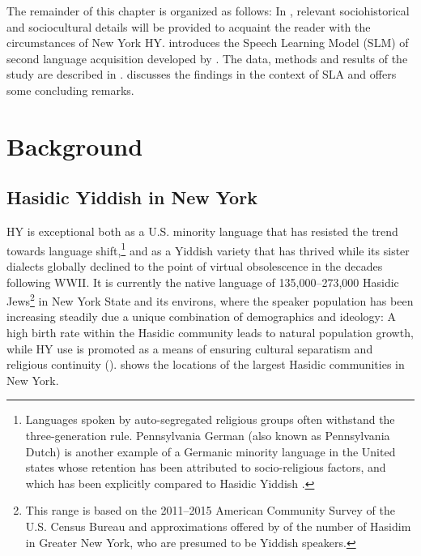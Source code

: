 \documentclass[output=paper]{langsci/langscibook}
\begin{document}
The remainder of this chapter is organized as follows: In , relevant sociohistorical and sociocultural details will be provided to acquaint the reader with the circumstances of New York HY.  introduces the Speech Learning Model (SLM) of second language acquisition developed by \citet{Flege1995, Flege1996}. The data, methods and results of the study are described in .  discusses the findings in the context of SLA and offers some concluding remarks.  

\section{Background}
\label{sec:nove:2}


\subsection{Hasidic Yiddish in New York}
\label{sec:nove:2.1}

HY is exceptional both as a U.S. minority language that has resisted the trend towards language shift,\footnote{Languages spoken by auto-segregated religious groups often withstand the three-generation rule. Pennsylvania German (also known as Pennsylvania Dutch) is another example of a Germanic minority language in the United states whose retention has been attributed to socio-religious factors, and which has been explicitly compared to Hasidic Yiddish \citep{Louden2016}.} and as a Yiddish variety that has thrived while its sister dialects globally declined to the point of virtual obsolescence in the decades following WWII. It is currently the native language of 135,000--273,000 Hasidic Jews\footnote{This range is based on the 2011--2015 American Community Survey of the U.S. Census Bureau \citep{MansonEtAl2017} and approximations offered by \citet{BialeEtAl2018} of the number of Hasidim in Greater New York, who are presumed to be Yiddish speakers.} in New York State and its environs, where the speaker population has been increasing steadily due a unique combination of demographics and ideology: A high birth rate within the Hasidic community leads to natural population growth, while HY use is promoted as a means of ensuring cultural separatism and religious continuity (\citealt{Fishman1965Yiddish, Shandler2006, Fader2009, Glinert1999}).  shows the locations of the largest Hasidic communities in New York. 
\end{document}

